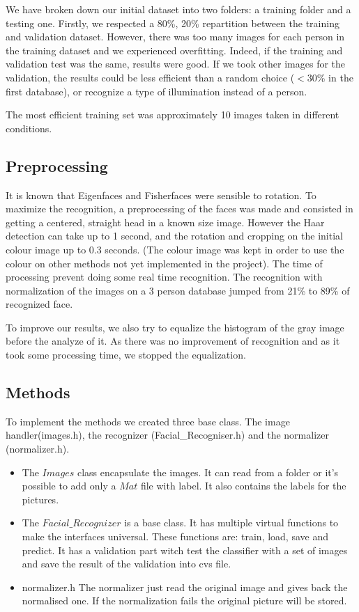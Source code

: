 We have broken down our initial dataset into two folders: a training folder and a testing one. Firstly, we respected a 80\%, 20\% repartition between the training and validation dataset. However, there was too many images for each person in the training dataset and we experienced overfitting. Indeed, if the training and validation test was the same, results were good. If we took other images for the validation, the results could be less efficient than a random choice ($<$30\% in the first database), or recognize a type of illumination instead of a person.

The most efficient training set was approximately 10 images taken in different conditions. 

\subsection{Preprocessing}
It is known that Eigenfaces and Fisherfaces were sensible to rotation. To maximize the recognition, a preprocessing of the faces was made and consisted in getting a centered, straight head in a known size image. However the Haar detection can take up to 1 second, and the rotation and cropping on the initial colour image up to 0.3 seconds. (The colour image was kept in order to use the colour on other methods not yet implemented in the project). The time of processing prevent doing some real time recognition. The recognition with normalization of the images on a 3 person database jumped from 21\% to 89\% of recognized face.

To improve our results, we also try to equalize the histogram of the gray image before the analyze of it. As there was no improvement of recognition and as it took some processing time, we stopped the equalization.

\subsection{Methods}

To implement the methods we created three base class. The image handler(images.h), the recognizer (Facial\_Recogniser.h) and the normalizer (normalizer.h).
\begin{itemize}
	\item The $Images$ class encapsulate the images. It can read from a folder or it's possible to add only a $Mat$ file with label. It also contains the labels for the pictures.
	
	\item The $Facial\_Recognizer$ is a base class. It has multiple virtual functions to make the interfaces universal. These functions are: train, load, save and predict. It has a validation part witch test the classifier with a set of images and save the result of the validation into cvs file.
	
	\item normalizer.h
	The normalizer just read the original image and gives back the normalised one. If the normalization fails the original picture will be stored.
	
\end{itemize}

